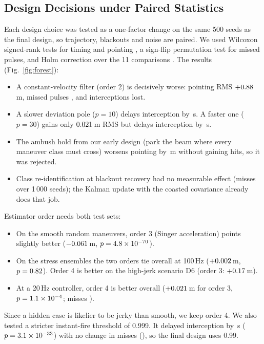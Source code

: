 \documentclass[conference]{IEEEtran}
\begin{document}
\subsection{Design Decisions under Paired Statistics}
\label{sec:ablation}
Each design choice was tested as a one-factor change on the same 500 seeds as the final design, so trajectory, blackouts and noise are paired. We used Wilcoxon signed-rank tests for timing and pointing \cite{wilcoxon1945}, a sign-flip permutation test for missed pulses, and Holm correction over the 11 comparisons \cite{holm1979}. The results (Fig.~\ref{fig:forest}):
\begin{itemize}
\item A constant-velocity filter (order 2) is decisively worse: pointing RMS $+0.88$\,m, missed pulses \abOtwoMiss, and \abOtwoLost{} interceptions lost.
\item A slower deviation pole ($p=10$) delays interception by \abPtenFh\,s. A faster one ($p=30$) gains only $0.021$\,m RMS but delays interception by \abPthirtyFh\,s.
\item The ambush hold from our early design (park the beam where every maneuver class must cross) worsens pointing by \abAmbRms\,m without gaining hits, so it was rejected.
\item Class re-identification at blackout recovery had no measurable effect (misses \noreidMiss{} over 1\,000 seeds); the Kalman update with the coasted covariance already does that job.
\end{itemize}

Estimator order needs both test sets:
\begin{itemize}
\item On the smooth random maneuvers, order 3 (Singer acceleration) points slightly better ($-0.061$\,m, $p=4.8\times10^{-70}$).
\item On the stress ensembles the two orders tie overall at 100\,Hz ($+0.002$\,m, $p=0.82$). Order 4 is better on the high-jerk scenario D6 (order 3: $+0.17$\,m).
\item At a 20\,Hz controller, order 4 is better overall ($+0.021$\,m for order 3, $p=1.1\times10^{-4}$; misses \stTwentyMiss).
\end{itemize}
Since a hidden case is likelier to be jerky than smooth, we keep order 4. We also tested a stricter instant-fire threshold of 0.999. It delayed interception by \stPsureFh\,s ($p=3.1\times10^{-33}$) with no change in misses (\stPsureMiss), so the final design uses 0.99.
\end{document}
